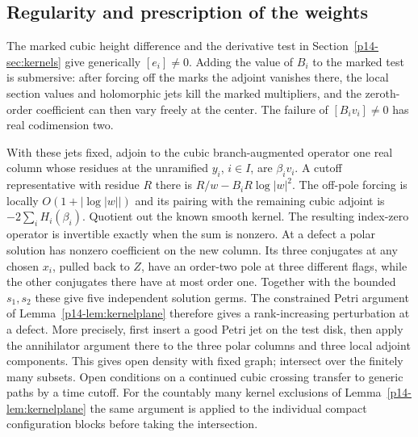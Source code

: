 \subsection{Regularity and prescription of the weights}
The marked cubic height difference and the derivative test in
Section~\ref{p14-sec:kernels} give generically $[e_i]\ne0$. Adding the
value of $B_i$ to the marked test is submersive: after forcing off
the marks the adjoint vanishes there, the local section values and
holomorphic jets kill the marked multipliers, and the zeroth-order
coefficient can then vary freely at the center. The failure of
$[B_iv_i]\ne0$ has real codimension two.

With these jets fixed, adjoin to the cubic branch-augmented operator
one real column whose residues at the unramified $y_i$, $i\in I$,
are $\beta_iv_i$. A cutoff representative with residue $R$ there is
$R/w-B_iR\log|w|^2$. The off-pole forcing is locally
$O(1+|\log |w||)$ and its pairing with the remaining cubic adjoint
is $-2\sum_iH_i(\beta_i)$. Quotient out the known smooth kernel.
The resulting index-zero operator is invertible exactly when the sum
is nonzero. At a defect a polar solution has nonzero coefficient on
the new column. Its three conjugates at any chosen $x_i$, pulled
back to $Z$, have an order-two pole at three different flags, while
the other conjugates there have at most order one. Together with
the bounded $s_1,s_2$ these give five independent solution germs.
The constrained Petri argument of Lemma~\ref{p14-lem:kernelplane}
therefore gives a rank-increasing perturbation at a defect. More
precisely, first insert a good Petri jet on the test disk, then
apply the annihilator argument there to the three polar columns and
three local adjoint components. This gives open density with fixed
graph; intersect over the finitely many subsets. Open conditions on
a continued cubic crossing transfer to generic paths by a time
cutoff. For the countably many kernel exclusions of
Lemma~\ref{p14-lem:kernelplane} the same argument is applied to the
individual compact configuration blocks before taking the intersection.

